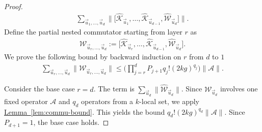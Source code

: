 \documentclass[aps,pra,reprint,groupedaddress,floatfix]{revtex4-2}
\newcommand{\lem}[1]{\hyperref[lem:#1]{Lemma~\ref*{lem:#1}}}
\newcommand{\mc}{\mathcal}
\begin{document}
\begin{proof}
\begin{align*}
        \sum_{\vec{u}_{1}, \ldots, \vec{u}_{d}} \bigg\| \Big[ \hat{\mathcal{K}}_{\vec{u}_1}, \ldots, \hat{\mathcal{K}}_{\vec{u}_{d-1}}, 
        \hat{\mathcal{W}}_{\vec{u}_d} \Big] \bigg\|.
    \end{align*}
    Define the partial nested commutator starting from layer $r$ as
    \begin{align*}
        \mathcal{W}_{\vec{u}_{r}, \ldots, \vec{u}_d} := \Big[ \hat{\mathcal{K}}_{\vec{u}_r}, \ldots, \hat{\mathcal{K}}_{\vec{u}_{d-1}}, \hat{\mathcal{W}}_{\vec{u}_d} \Big].
    \end{align*}
    We prove the following bound by backward induction on $r$ from $d$ to $1$
    \begin{align} \label{eq:induct-W}
        \sum_{\vec{u}_{r}, \ldots, \vec{u}_{d}} \Big\|\mathcal{W}_{\vec{u}_{r}, \ldots, \vec{u}_d}\Big\|\le \bigg(\prod_{j=r}^{d}P_{j+1} q_j!(2kg)^{q_j}\bigg)\|\mc A\|.
    \end{align}
    
    Consider the base case $r=d$. The term is $\sum_{\vec{u}_d} \|\hat{\mathcal{W}}_{\vec{u}_d}\|$. Since $\mathcal{W}_{\vec{u}_d}$ involves one fixed operator $\mathcal{A}$ and $q_d$ operators from a $k$-local set, we apply \lem{commu-bound}. This yields the bound $q_d!(2kg)^{q_d}\|\mathcal{A}\|$. Since $P_{d+1}=1$, the base case holds.


\end{proof}
\end{document}
